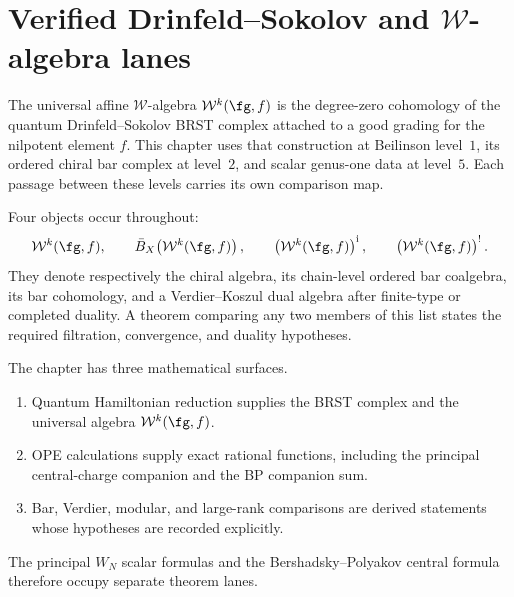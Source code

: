 \providecommand{\BRST}{\mathrm{BRST}}
\providecommand{\BRSTGauged}{\mathrm{BRSTGaugedChirAlg}}
\providecommand{\PhiFA}{\Phi^{\mathrm{FA}}}
\providecommand{\SpCh}{\mathrm{Sp}^{\mathrm{ch}}}
\providecommand{\BP}{\mathrm{BP}}
\providecommand{\ClaimStatusComputed}{\textnormal{[computed]}}

\section{Verified Drinfeld--Sokolov and \texorpdfstring{$\mathcal W$}{W}-algebra lanes}
\label{sec:walg-deep-repaired}

The universal affine \(\mathcal W\)-algebra
\(\mathcal W^k(\fg,f)\) is the degree-zero cohomology of the quantum
Drinfeld--Sokolov BRST complex attached to a good grading for the
nilpotent element \(f\).  This chapter uses that construction at
Beilinson level~\(1\), its ordered chiral bar complex at level~\(2\),
and scalar genus-one data at level~\(5\).  Each passage between these
levels carries its own comparison map.

Four objects occur throughout:
\[
\mathcal W^k(\fg,f),\qquad
\bar B_X\!\left(\mathcal W^k(\fg,f)\right),\qquad
\left(\mathcal W^k(\fg,f)\right)^{\mathrm i},\qquad
\left(\mathcal W^k(\fg,f)\right)^!.
\]
They denote respectively the chiral algebra, its chain-level ordered
bar coalgebra, its bar cohomology, and a Verdier--Koszul dual algebra
after finite-type or completed duality.  A theorem comparing any two
members of this list states the required filtration, convergence, and
duality hypotheses.

\begin{remark}
\label{rem:w-deep-three-pillar}
The chapter has three mathematical surfaces.
\begin{enumerate}[label=\textup{(\roman*)}]
\item Quantum Hamiltonian reduction supplies the BRST complex and the
  universal algebra \(\mathcal W^k(\fg,f)\).
\item OPE calculations supply exact rational functions, including the
  principal central-charge companion and the BP companion sum.
\item Bar, Verdier, modular, and large-rank comparisons are derived
  statements whose hypotheses are recorded explicitly.
\end{enumerate}
The principal \(W_N\) scalar formulas and the Bershadsky--Polyakov
central formula therefore occupy separate theorem lanes.
\end{remark}

